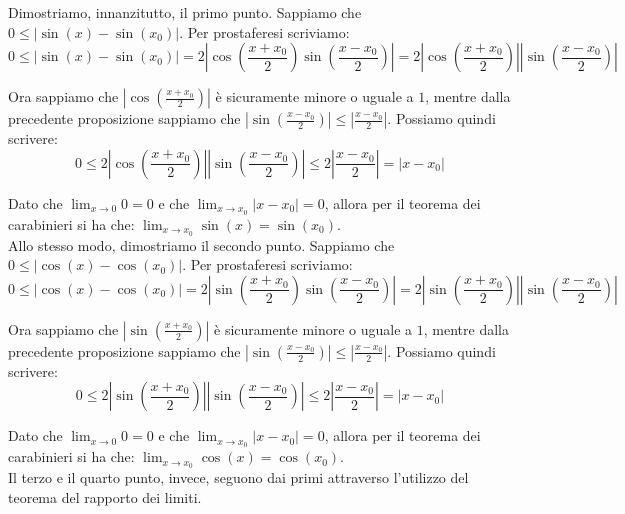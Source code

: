 \documentclass{article}
\begin{document}
\noindent Dimostriamo, innanzitutto, il primo punto. Sappiamo che $0 \leq |\sin(x) - \sin(x_0)|$. Per prostaferesi scriviamo:
\begin{equation*}
    0 \leq |\sin(x) - \sin(x_0)| = 2\left|\cos\left(\frac{x + x_0}{2}\right)\sin\left(\frac{x - x_0}{2}\right)\right| = 2\left|\cos\left(\frac{x + x_0}{2}\right)\right|\left|\sin\left(\frac{x - x_0}{2}\right)\right|
\end{equation*}

\noindent Ora sappiamo che $|\cos(\frac{x + x_0}{2})|$ è sicuramente minore o uguale a $1$, mentre dalla precedente proposizione sappiamo che $|\sin(\frac{x - x_0}{2})| \leq |\frac{x - x_0}{2}|$. Possiamo quindi scrivere:
\begin{equation*}
    0 \leq 2 \left|\cos\left(\frac{x + x_0}{2}\right)\right|\left|\sin\left(\frac{x - x_0}{2}\right)\right| \leq 2 \left|\frac{x - x_0}{2}\right| = |x - x_0|
\end{equation*}

\noindent Dato che $\lim_{x \to 0} 0 = 0$ e che $\lim_{x \to x_0} |x - x_0| = 0$, allora per il teorema dei carabinieri si ha che: $\lim_{x \to x_0} \sin(x) = \sin(x_0)$.\\

\noindent Allo stesso modo, dimostriamo il secondo punto. Sappiamo che $0 \leq |\cos(x) - \cos(x_0)|$. Per prostaferesi scriviamo:
\begin{equation*}
    0 \leq |\cos(x) - \cos(x_0)| = 2 \left|\sin\left(\frac{x + x_0}{2}\right)\sin\left(\frac{x - x_0}{2}\right)\right| = 2\left|\sin\left(\frac{x + x_0}{2}\right)\right|\left|\sin\left(\frac{x - x_0}{2}\right)\right|
\end{equation*}

\noindent Ora sappiamo che $|\sin(\frac{x + x_0}{2})|$ è sicuramente minore o uguale a $1$, mentre dalla precedente proposizione sappiamo che $|\sin(\frac{x - x_0}{2})| \leq |\frac{x - x_0}{2}|$. Possiamo quindi scrivere:
\begin{equation*}
    0 \leq 2\left|\sin\left(\frac{x + x_0}{2}\right)\right|\left|\sin\left(\frac{x - x_0}{2}\right)\right| \leq 2 \left|\frac{x - x_0}{2}\right| = |x - x_0|
\end{equation*}

\noindent Dato che $\lim_{x \to 0} 0 = 0$ e che $\lim_{x \to x_0} |x - x_0| = 0$, allora per il teorema dei carabinieri si ha che: $\lim_{x \to x_0} \cos(x) = \cos(x_0)$.\\

\noindent Il terzo e il quarto punto, invece, seguono dai primi attraverso l'utilizzo del teorema del rapporto dei limiti.\\
\end{document}
